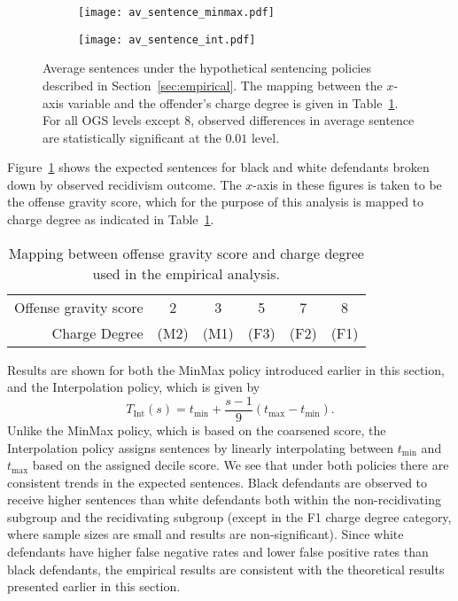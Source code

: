 \documentclass[11pt, svgnames]{article}
\numberwithin{equation}{section}
\theoremstyle{plain}
\theoremstyle{definition}
\numberwithin{prop}{section}
\numberwithin{corollary}{section}
\begin{document}
\begin{figure}[ht]
 \centering
 \begin{subfigure}[t]{0.48\linewidth}
   \texttt{[image: av\_sentence\_minmax.pdf]}
 \end{subfigure}
 \hspace{1em}
 \begin{subfigure}[t]{0.48\linewidth}
   \texttt{[image: av\_sentence\_int.pdf]}
 \end{subfigure}

 \vspace{1em}
 \caption{Average sentences under the hypothetical sentencing policies described in Section~\ref{sec:empirical}.  The mapping between the $x$-axis variable and the offender's charge degree is given in Table~\ref{tab:ogsmap}.  For all OGS levels except 8, observed differences in average sentence are statistically significant at the $0.01$ level.}
 \label{fig:empirical}
\end{figure}


Figure~\ref{fig:empirical} shows the expected sentences for black and white defendants broken down by observed recidivism outcome.  The $x$-axis in these figures is taken to be the offense gravity score, which for the purpose of this analysis is mapped to charge degree as indicated in Table~\ref{tab:ogsmap}.


\begin{table}[h]
  \centering
    \begin{tabular}{|r|ccccc|}
      \hline
      Offense gravity score & 2 & 3 & 5 & 7 & 8 \\ 
      Charge Degree & (M2) & (M1) & (F3) & (F2) & (F1) \\ 
      \hline
    \end{tabular}
\caption{Mapping between offense gravity score and charge degree used in the empirical analysis.}
\label{tab:ogsmap}
\end{table}

Results are shown for both the MinMax policy introduced earlier in this section, and the Interpolation policy, which is given by
%
\begin{equation}
    T_{\mathrm{Int}}(s) = t_{\mathrm{min}} + \frac{s - 1}{9}(t_{\mathrm{max}} - t_{\mathrm{min}}).
\end{equation}
%
Unlike the MinMax policy, which is based on the coarsened score, the Interpolation policy assigns sentences by linearly interpolating between $t_\mathrm{min}$ and $t_\mathrm{max}$ based on the assigned decile score.  We see that under both policies there are consistent trends in the expected sentences.  Black defendants are observed to receive higher sentences than white defendants both within the non-recidivating subgroup and the recidivating subgroup (except in the F1 charge degree category, where sample sizes are small and results are non-significant).  Since white defendants have higher false negative rates and lower false positive rates than black defendants, the empirical results are consistent with the theoretical results presented earlier in this section.  
\end{document}
